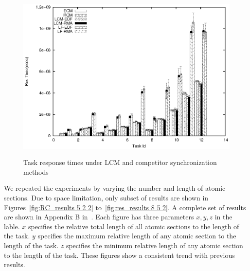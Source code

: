 \begin{figure}[htbp]
{\includegraphics[scale=0.6]{figures/Res_Time_12t_nl_g_30_0.2_0.2_0.2_1.eps}
\label{fig-res-set3-1}
}
\caption{Task response times under LCM and competitor synchronization methods}
\label{fig:res_results-1}
\end{figure}

We repeated the experiments by varying the number and length of atomic sections. Due to space limitation, only subset of results are shown in Figures~\ref{fig:RC_results 5 2 2} to~\ref{fig:res_results 8 5 2}. 
A complete set of results are shown in Appendix B in~\cite{stmconcurrencycontrol_techreport}. Each figure has three parameters $x,y,z$ in the lable. $x$ specifies the relative total length of all atomic sections to the length of the task. $y$ specifies the maximum relative length of any atomic section to the length of the task. $z$ specifies the minimum relative length of any atomic section to the length of the task. These figures show a consistent trend with previous results.


